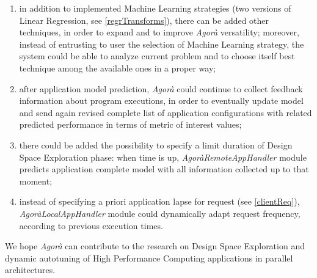 \begin{enumerate}

	\item in addition to implemented Machine Learning strategies (two versions of Linear Regression, see \ref{regrTransforms}), there can be added other techniques, in order to expand and to improve \textit{Agorà} versatility; moreover, instead of entrusting to user the selection of Machine Learning strategy, the system could be able to analyze current problem and to choose itself best technique among the available ones in a proper way;

	\item after application model prediction, \textit{Agorà} could continue to collect feedback information about program executions, in order to eventually update model and send again revised complete list of application configurations with related predicted performance in terms of metric of interest values;

	\item there could be added the possibility to specify a limit duration of Design Space Exploration phase: when time is up, \textit{AgoràRemoteAppHandler} module predicts application complete model with all information collected up to that moment;

	\item instead of specifying a priori application lapse for request (see \ref{clientReq}), \textit{AgoràLocalAppHandler} module could dynamically adapt request frequency, according to previous execution times.

\end{enumerate}

We hope \textit{Agorà} can contribute to the research on Design Space Exploration and dynamic autotuning of High Performance Computing applications in parallel architectures.
